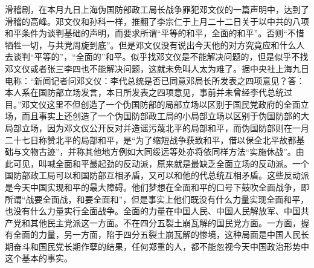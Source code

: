 滑稽剧，在本月九日上海伪国防部政工局长战争罪犯邓文仪的一篇声明中，达到了滑稽的高峰。邓文仪和孙科一样，推翻了李宗仁于上月二十二日关于以中共的八项和平条件为谈判基础的声明，而要求所谓“平等的和平，全面的和平”。否则“不惜牺牲一切，与共党周旋到底”。但是邓文仪没有说出今天他的对方究竟应和什么人去谈判“平等的”，“全面的”和平。似乎找邓文仪是不能解决问题的，但是似乎不找邓文仪或者张三李四也不能解决问题，这就未免叫人太为难了。据中央社上海九日电称：“新闻记者问邓文仪：李代总统是否已同意邓局长所发表之四项意见？答：本人系在国防部立场发言，本日所发表之四项意见，事前并未曾经李代总统过目。”邓文仪这里不但创造了一个伪国防部的局部立场以区别于国民党政府的全面立场，而且事实上还创造了一个伪国防部政工局的小局部立场以区别于伪国防部的大局部立场，因为邓文仪公开反对并造谣污蔑北平的局部和平，而伪国防部则在一月二十七日称赞北平的局部和平，是“为了缩短战争获致和平，借以保全北平故都基础与文物古迹”，并称其他地方例如大同绥远等处亦将依同样方法“实施休战”。由此可见，叫喊全面和平最起劲的反动派，原来就是最缺乏全面立场的反动派。一个国防部政工局可以和国防部互相矛盾，又可以和他的代总统互相矛盾。这些反动派是今天中国实现和平的最大障碍。他们梦想在全面和平的口号下鼓吹全面战争，即所谓“战要全面战，和要全面和”，但是事实上他们既没有什么力量实现全面和平，也没有什么力量实行全面战争。全面的力量在中国人民、中国人民解放军、中国共产党和其他民主党派这一方面。不在四分五裂土崩瓦解的国民党方面。一方面，握有全面的力量，另一方面，陷于四分五裂土崩瓦解的惨境，这种局面是中国人民长期奋斗和国民党长期作孽的结果，任何郑重的人，都不能忽视今天中国政治形势中这个基本的事实。

